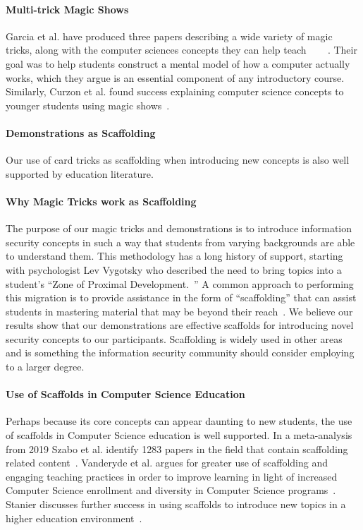 \paragraph{Multi-trick Magic Shows}
Garcia et al. have produced three papers describing a wide variety of magic
tricks, along with the computer sciences concepts they can help
teach~\cite{garcia2012demystifying}
~\cite{garcia2013demystifying}
~\cite{garcia2016demystifying}.
Their goal was to help students construct a mental model of how a computer
actually works, which they argue is an essential component of any introductory
course.
Similarly, Curzon et al. found success explaining computer
science concepts to younger students using magic shows~\cite{Curzon2008}.

\paragraph{Demonstrations as Scaffolding}
Our use of card tricks as scaffolding when introducing new concepts is also well
supported by education literature.

\paragraph{Why Magic Tricks work as Scaffolding}
The purpose of our magic tricks and demonstrations is to introduce
information security concepts in such a way that students from varying
backgrounds are able to understand them.  This methodology has a long history of
support, starting with psychologist Lev Vygotsky
who described the need to bring topics into a
student's ``Zone of Proximal Development.~\cite{vygotsky1978}''
A common approach to performing this migration is to provide assistance in the
form of ``scaffolding'' that can assist students in mastering material that may
be beyond their reach~\cite{wood1976role}.  We believe our results show that our
demonstrations are effective scaffolds for introducing novel security concepts
to our participants.  Scaffolding is widely used in other areas and is something
the information security community should consider employing to a larger degree.

\paragraph{Use of Scaffolds in Computer Science Education}
Perhaps because its core concepts can appear daunting to new students,
the use of scaffolds in Computer Science education is well supported. In a
meta-analysis from 2019 Szabo et
al. identify 1283 papers in the field that contain scaffolding related
content~\cite{szabometa}.
Vanderyde et al. argues for greater use of scaffolding and
engaging teaching practices in order to improve learning in light of increased
Computer Science enrollment and diversity in Computer Science
programs~\cite{vanderhydescaffolding}.  Stanier discusses further success in
using scaffolds to introduce new topics in a higher education
environment~\cite{stanierhighered}.
